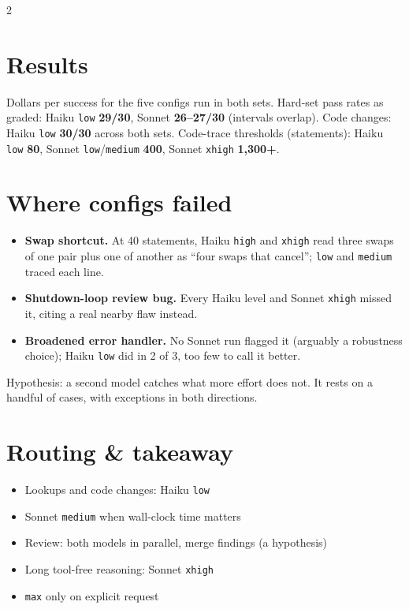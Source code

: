 \documentclass[a4paper,9pt]{extarticle}
\begin{document}
\begin{multicols}{2}
\columnbreak

\section*{Results}
\begin{center}
\resizebox{0.95\linewidth}{!}{}
\end{center}
\vspace{-0.6em}

\noindent Dollars per success for the five configs run in both sets. Hard-set pass
rates as graded: Haiku \texttt{low} \textbf{29/30}, Sonnet \textbf{26--27/30} (intervals overlap).
Code changes: Haiku \texttt{low} \textbf{30/30} across both sets. Code-trace
thresholds (statements): Haiku \texttt{low} \textbf{80}, Sonnet
\texttt{low}/\texttt{medium} \textbf{400}, Sonnet \texttt{xhigh} \textbf{1,300+}.

\section*{Where configs failed}
\begin{itemize}
  \item \textbf{Swap shortcut.} At 40 statements, Haiku \texttt{high} and
    \texttt{xhigh} read three swaps of one pair plus one of another as
    ``four swaps that cancel''; \texttt{low} and \texttt{medium} traced each line.
  \item \textbf{Shutdown-loop review bug.} Every Haiku level and Sonnet
    \texttt{xhigh} missed it, citing a real nearby flaw instead.
  \item \textbf{Broadened error handler.} No Sonnet run flagged it (arguably a
    robustness choice); Haiku \texttt{low} did in 2 of 3, too few to call it better.
\end{itemize}
\noindent Hypothesis: a second model catches what more effort does not. It
rests on a handful of cases, with exceptions in both directions.

\section*{Routing \& takeaway}
\begin{itemize}
  \item Lookups and code changes: Haiku \texttt{low}
  \item Sonnet \texttt{medium} when wall-clock time matters
  \item Review: both models in parallel, merge findings (a hypothesis)
  \item Long tool-free reasoning: Sonnet \texttt{xhigh}
  \item \texttt{max} only on explicit request
\end{itemize}


\end{multicols}
\end{document}
